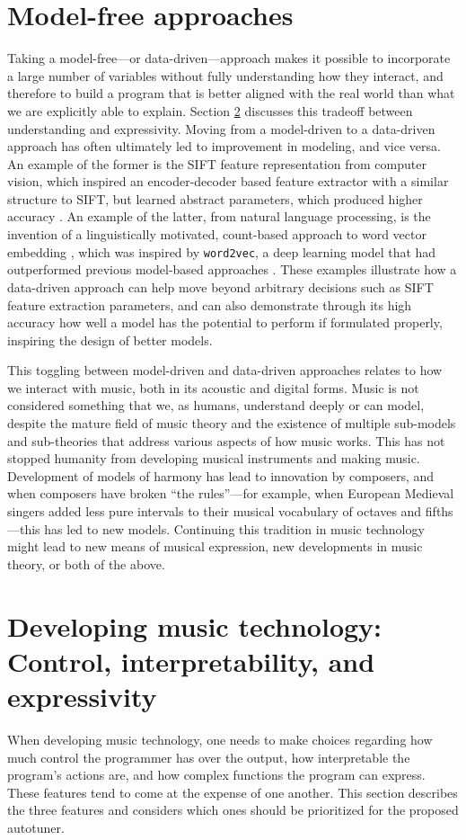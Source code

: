 \section{Model-free approaches}
\label{sec:pretheory}
Taking a model-free---or data-driven---approach makes it possible to incorporate a large number of variables without fully understanding how they interact, and therefore to build a program that is better aligned with the real world than what we are explicitly able to explain. Section \ref{sec:control-interpret-express} discusses this tradeoff between understanding and expressivity. Moving from a model-driven to a data-driven approach has often ultimately led to improvement in modeling, and vice versa. An example of the former is the SIFT feature representation from computer vision, which inspired an encoder-decoder based feature extractor with a similar structure to SIFT, but learned abstract parameters, which produced higher accuracy \cite{zheng2017sift}. An example of the latter, from natural language processing, is the invention of a linguistically motivated, count-based approach to word vector embedding \cite{pennington2014glove}, which was inspired by \texttt{word2vec}, a deep learning model that had outperformed previous model-based approaches \cite{mikolov2013efficient}. These examples illustrate how a data-driven approach can help move beyond arbitrary decisions such as SIFT feature extraction parameters, and can also demonstrate through its high accuracy how well a model has the potential to perform if formulated properly, inspiring the design of better models.

This toggling between model-driven and data-driven approaches relates to how we interact with music, both in its acoustic and digital forms. Music is not considered something that we, as humans, understand deeply or can model, despite the mature field of music theory and the existence of multiple sub-models and sub-theories that address various aspects of how music works. This has not stopped humanity from developing musical instruments and making music. Development of models of harmony has lead to innovation by composers, and when composers have broken ``the rules''---for example, when European Medieval singers added less pure intervals to their musical vocabulary of octaves and fifths---this has led to new models. Continuing this tradition in music technology might lead to new means of musical expression, new developments in music theory, or both of the above.

\section{Developing music technology: Control, interpretability, and expressivity}
\label{sec:control-interpret-express}
When developing music technology, one needs to make choices regarding how much control the programmer has over the output, how interpretable the program's actions are, and how complex functions the program can express. These features tend to come at the expense of one another. This section describes the three features and considers which ones should be prioritized for the proposed autotuner. 

